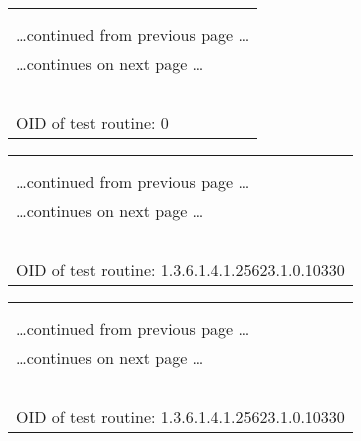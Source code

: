 \documentclass{article}
\begin{document}
\begin{longtable}{|p{}|}
\hline
\rowcolor{openvas_log}{\color{white}{Log}}\\
\rowcolor{openvas_log}{\color{white}{NVT: }}\\
\hline
\endfirsthead
\hfill\ldots continued from previous page \ldots \\
\hline
\endhead
\hline
\ldots continues on next page \ldots \\
\endfoot
\hline
\endlastfoot
\\
\rowcolor{white}{\verb=Open port.=}\\
\rowcolor{white}{\verb==}\\
\rowcolor{white}{\verb==}\\
\\
OID of test routine: 0\\
\end{longtable}

\begin{longtable}{|p{}|}
\hline
\rowcolor{openvas_log}{\color{white}{Log (CVSS: 0.0) }}\\
\rowcolor{openvas_log}{\color{white}{NVT: Services}}\\
\hline
\endfirsthead
\hfill\ldots continued from previous page \ldots \\
\hline
\endhead
\hline
\ldots continues on next page \ldots \\
\endfoot
\hline
\endlastfoot
\\
\rowcolor{white}{\verb=A TLSv1 server answered on this port=}\\
\rowcolor{white}{\verb==}\\
\rowcolor{white}{\verb==}\\
\\
OID of test routine: 1.3.6.1.4.1.25623.1.0.10330\\
\end{longtable}

\begin{longtable}{|p{}|}
\hline
\rowcolor{openvas_log}{\color{white}{Log (CVSS: 0.0) }}\\
\rowcolor{openvas_log}{\color{white}{NVT: Services}}\\
\hline
\endfirsthead
\hfill\ldots continued from previous page \ldots \\
\hline
\endhead
\hline
\ldots continues on next page \ldots \\
\endfoot
\hline
\endlastfoot
\\
\rowcolor{white}{\verb=A pop3 server is running on this port=}\\
\rowcolor{white}{\verb==}\\
\rowcolor{white}{\verb==}\\
\\
OID of test routine: 1.3.6.1.4.1.25623.1.0.10330\\
\end{longtable}
\end{document}
